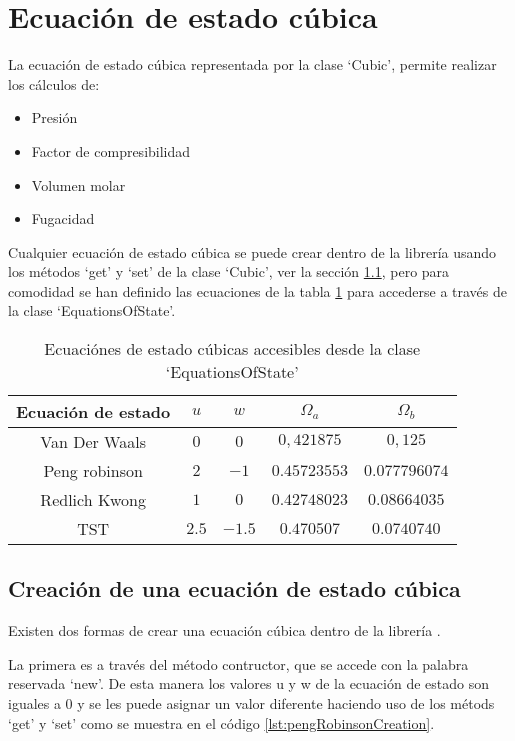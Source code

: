 \section{Ecuación de estado cúbica}\label{sec:cubic}

	La ecuación de estado cúbica representada por la clase `Cubic', permite realizar los cálculos de: 
	\begin{itemize}	\itemsep0ex
		\item Presión
		\item Factor de compresibilidad
		\item Volumen molar
		\item Fugacidad
	\end{itemize}

	Cualquier ecuación de estado cúbica se puede crear dentro de la librería \Materia usando los métodos `get' y `set' de la clase `Cubic', ver la sección \ref{subsec:cubicCreation}, pero para comodidad se han definido las ecuaciones de la tabla \ref{tab:cubics} para accederse a través de la clase `EquationsOfState'.

	\begin{table}[!h]
		\centering
		\caption{Ecuaciónes de estado cúbicas accesibles desde la clase `EquationsOfState'}\label{tab:cubics}
		\begin{tabular}{|c |c | c | c | c |}
			\hline
			Ecuación de estado  & $u$ & $w$ & $\Omega_a$&$\Omega_b$\\
			\hline
			Van Der Waals  & $0$ & $0$ & $0,421875$ & $0,125$\\
			\hline
			Peng robinson  & $2$ & $-1$ & $0.45723553$ & $0.077796074$\\
			\hline
			Redlich Kwong  & $1$ & $0$ & $0.42748023$ & $0.08664035$\\
			\hline
			TST  & $2.5$ & $-1.5$ &$ 0.470507$ & $0.0740740$\\
			\hline
		\end{tabular}		
	\end{table}

\subsection{Creación de una ecuación de estado cúbica}\label{subsec:cubicCreation}

	Existen dos formas de crear una ecuación cúbica dentro de la librería \Materia.

	La primera es a través del método contructor, que se accede con la palabra reservada  `new'. De esta manera los valores u y w de la ecuación de estado son iguales a 0 y se les puede asignar un valor diferente haciendo uso de los métods `get' y `set' como se muestra en el código \ref{lst:pengRobinsonCreation}.

